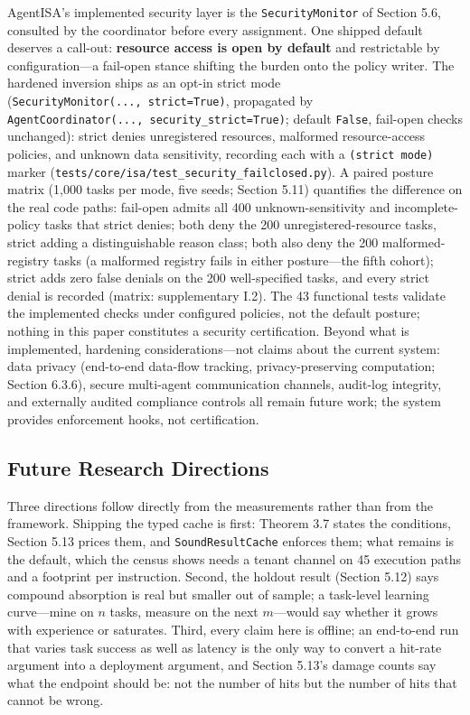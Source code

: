 \documentclass[
  sigconf,
  anonymous]{acmart}
\begin{document}
AgentISA's implemented security layer is the \texttt{SecurityMonitor} of
Section 5.6, consulted by the coordinator before every assignment. One
shipped default deserves a call-out: \textbf{resource access is open by
default} and restrictable by configuration---a fail-open stance shifting
the burden onto the policy writer. The hardened inversion ships as an
opt-in strict mode (\texttt{SecurityMonitor(...,\ strict=True)},
propagated by \texttt{AgentCoordinator(...,\ security\_strict=True)};
default \texttt{False}, fail-open checks unchanged): strict denies
unregistered resources, malformed resource-access policies, and unknown
data sensitivity, recording each with a \texttt{(strict\ mode)} marker
(\texttt{tests/core/isa/test\_security\_failclosed.py}). A paired
posture matrix (1,000 tasks per mode, five seeds; Section 5.11)
quantifies the difference on the real code paths: fail-open admits all
400 unknown-sensitivity and incomplete-policy tasks that strict denies;
both deny the 200 unregistered-resource tasks, strict adding a
distinguishable reason class; both also deny the 200 malformed-registry
tasks (a malformed registry fails in either posture---the fifth cohort);
strict adds zero false denials on the 200 well-specified tasks, and
every strict denial is recorded (matrix: supplementary I.2). The 43
functional tests validate the implemented checks under configured
policies, not the default posture; nothing in this paper constitutes a
security certification. Beyond what is implemented, hardening
considerations---not claims about the current system: data privacy
(end-to-end data-flow tracking, privacy-preserving computation; Section
6.3.6), secure multi-agent communication channels, audit-log integrity,
and externally audited compliance controls all remain future work; the
system provides enforcement hooks, not certification.

\subsection{Future Research
Directions}\label{future-research-directions}

Three directions follow directly from the measurements rather than from
the framework. Shipping the typed cache is first: Theorem 3.7 states the
conditions, Section 5.13 prices them, and \texttt{SoundResultCache}
enforces them; what remains is the default, which the census shows needs
a tenant channel on 45 execution paths and a footprint per instruction.
Second, the holdout result (Section 5.12) says compound absorption is
real but smaller out of sample; a task-level learning curve---mine on
\(n\) tasks, measure on the next \(m\)---would say whether it grows with
experience or saturates. Third, every claim here is offline; an
end-to-end run that varies task success as well as latency is the only
way to convert a hit-rate argument into a deployment argument, and
Section 5.13's damage counts say what the endpoint should be: not the
number of hits but the number of hits that cannot be wrong.
\end{document}
